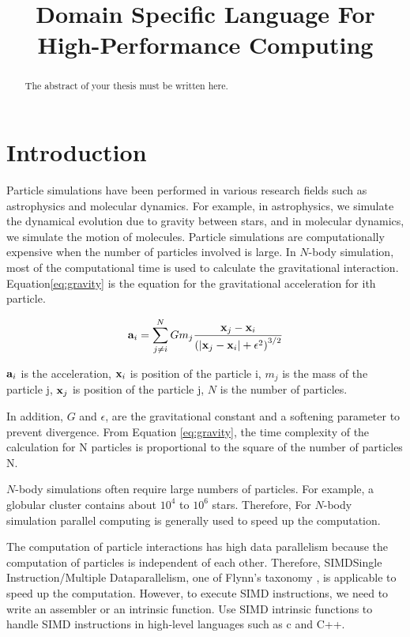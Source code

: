 \documentclass[ams]{article}
\title{Domain Specific Language For High-Performance Computing}
\begin{document}
	\maketitle
	\begin{abstract}
		The abstract of your thesis must be written here.
	\end{abstract} 
	
	\section{Introduction}

Particle simulations have been performed in various research fields such as astrophysics and molecular dynamics. For example, in astrophysics, we simulate the dynamical evolution due to gravity between stars,
and in molecular dynamics, we simulate the motion of molecules.
Particle simulations are computationally expensive when the number of particles involved is large.
    In $N$-body simulation, most of the computational time is used to calculate 
the gravitational interaction. Equation\eqref{eq:gravity} is 
the equation for the gravitational acceleration for ith particle.


\begin{equation}
\vb{a}_i = \sum_{\substack{j \neq i}}^{N} G m_j \frac{\vb{x}_j - \vb{x}_i}{\left( \left| \vb{x}_j - \vb{x}_i \right| + \epsilon^2 \right)^{3/2}\label{eq:gravity}}
\end{equation}


$\vb{a}_i$ is the acceleration, $\vb{x}_i$ is position of the particle i,
$m_j$ is the mass of the particle j, $\vb{x}_j$ is position of the particle j,
$N$ is the number of particles.

In addition, $G$ and $\epsilon$, are the gravitational constant and a softening parameter to prevent divergence.
From Equation \eqref{eq:gravity}, the time complexity of the calculation for N particles is proportional to 
the square of the number of particles N.

 $N$-body simulations often require large numbers of particles.
For example, a globular cluster contains about $10^4$ to $10^6 $ stars.
Therefore, For $N$-body simulation parallel computing is generally used to speed up the computation.



The computation of particle interactions has high
data parallelism because the computation of particles is 
independent of each other. Therefore, 
 SIMD\lparen Single Instruction/Multiple Data\rparen parallelism, 
one of Flynn's taxonomy \cite{flynn1972some}, is applicable to speed up the computation.
However, to execute SIMD instructions, we need to write an assembler or an intrinsic function.
Use SIMD intrinsic functions to handle SIMD instructions in high-level languages such as c and C++.
 
\end{document}

